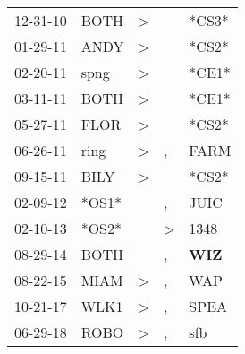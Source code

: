 \begin{supertabular}{p{0.07\textwidth}p{0.06\textwidth}p{0.02\textwidth}p{0.02\textwidth}p{0.06\textwidth}}
 12-31-10\textsuperscript{} &  BOTH\textsuperscript{} &  \textgreater &               &                           *CS3* \\
 01-29-11\textsuperscript{} &  ANDY\textsuperscript{} &  \textgreater &               &                           *CS2* \\
 02-20-11\textsuperscript{} &  spng\textsuperscript{} &  \textgreater &               &                           *CE1* \\
 03-11-11\textsuperscript{} &  BOTH\textsuperscript{} &  \textgreater &               &                           *CE1* \\
 05-27-11\textsuperscript{} &  FLOR\textsuperscript{} &  \textgreater &               &                           *CS2* \\
 06-26-11\textsuperscript{} &  ring\textsuperscript{} &  \textgreater &             , &          FARM\textsuperscript{} \\
 09-15-11\textsuperscript{} &  BILY\textsuperscript{} &  \textgreater &               &                           *CS2* \\
 02-09-12\textsuperscript{} &                   *OS1* &               &             , &          JUIC\textsuperscript{} \\
 02-10-13\textsuperscript{} &                   *OS2* &               &  \textgreater &          1348\textsuperscript{} \\
 08-29-14\textsuperscript{} &  BOTH\textsuperscript{} &               &             , &  \textbf{WIZ\textsuperscript{}} \\
 08-22-15\textsuperscript{} &  MIAM\textsuperscript{} &  \textgreater &             , &           WAP\textsuperscript{} \\
 10-21-17\textsuperscript{} &  WLK1\textsuperscript{} &  \textgreater &             , &          SPEA\textsuperscript{} \\
 06-29-18\textsuperscript{} &  ROBO\textsuperscript{} &  \textgreater &             , &           sfb\textsuperscript{} \\
\end{supertabular}
